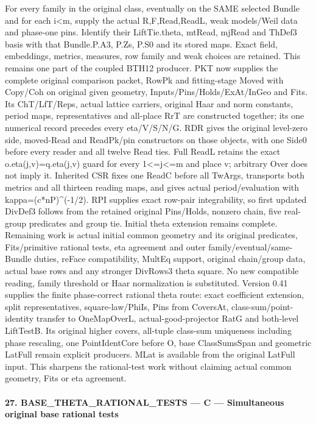 For every family in the original class, eventually on the SAME selected Bundle and for each i<m, supply the actual R,F,Read,ReadL, weak models/Weil data and phase-one pins. Identify their LiftTie.theta, mtRead, mjRead and ThDef3 basis with that Bundle.P.A3, P.Zs, P.S0 and its stored maps. Exact field, embeddings, metrics, measures, row family and weak choices are retained. This remains one part of the coupled BTH12 producer. PKT now supplies the complete original comparison packet, RowPk and fitting-stage Moved with Copy/Coh on original given geometry, Inputs/Pins/Holds/ExAt/InGeo and Fits. Its ChT/LfT/Reps, actual lattice carriers, original Haar and norm constants, period maps, representatives and all-place RrT are constructed together; its one numerical record precedes every eta/V/S/N/G. RDR gives the original level-zero side, moved-Read and ReadPk/pin constructors on those objects, with one Side0 before every reader and all twelve Read ties. Full ReadL retains the exact o.eta(j,v)=q.eta(j,v) guard for every 1<=j<=m and place v; arbitrary Over does not imply it. Inherited CSR fixes one ReadC before all TwArgs, transports both metrics and all thirteen reading maps, and gives actual period/evaluation with kappa=(c*nP)\textasciicircum{}(-1/2). RPI supplies exact row-pair integrability, so first updated DivDef3 follows from the retained original Pins/Holds, nonzero chain, five real-group predicates and group tie. Initial theta extension remains complete. Remaining work is actual initial common geometry and its original predicates, Fits/primitive rational tests, eta agreement and outer family/eventual/same-Bundle duties, reFace compatibility, MultEq support, original chain/group data, actual base rows and any stronger DivRows3 theta square. No new compatible reading, family threshold or Haar normalization is substituted. Version 0.41 supplies the finite phase-correct rational theta route: exact coefficient extension, split representatives, square-law/PhiIs, Pins from CoversAt, class-sum/point-identity transfer to OneMapOverL, actual-good-projector RatG and both-level LiftTestB. Its original higher covers, all-tuple class-sum uniqueness including phase rescaling, one PointIdentCore before O, base ClassSumsSpan and geometric LatFull remain explicit producers. MLat is available from the original LatFull input. This sharpens the rational-test work without claiming actual common geometry, Fits or eta agreement.



\paragraph{27. BASE\_\allowbreak THETA\_\allowbreak RATIONAL\_\allowbreak TESTS — C — Simultaneous original base rational tests}

